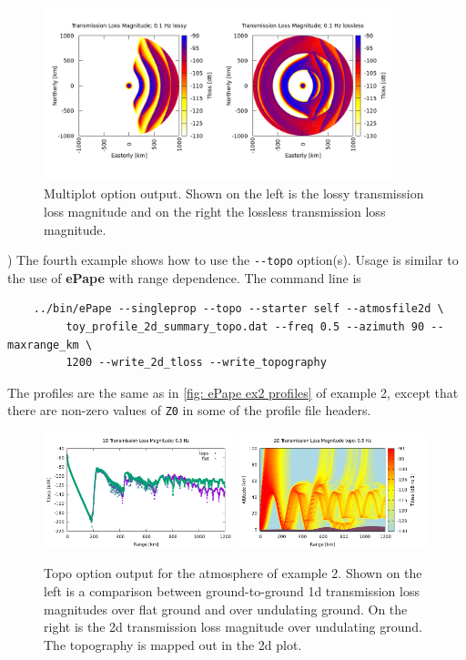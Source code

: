 \begin{figure}[h]
\begin{center}
\includegraphics[width=0.9\textwidth]{figs/ePape_ex3}
\end{center}
\caption{Multiplot option output. Shown on the left is the lossy transmission loss magnitude and on the right the lossless transmission loss magnitude.}
\label{fig: ePape ex3}
\end{figure}

) The fourth example shows how to use the \verb+--topo+ option(s). Usage is similar to the use of {\bf ePape} with range dependence. The command line is 
\begin{verbatim}
    ../bin/ePape --singleprop --topo --starter self --atmosfile2d \
         toy_profile_2d_summary_topo.dat --freq 0.5 --azimuth 90 --maxrange_km \
         1200 --write_2d_tloss --write_topography
\end{verbatim}
The profiles are the same as in \ref{fig: ePape ex2 profiles} of example 2, except that there are non-zero values of \verb+Z0+ in some of the profile file headers. 
\begin{figure}[h]
\begin{center}
\includegraphics[width=0.49\textwidth]{figs/ePape_ex4_1d}
\includegraphics[width=0.49\textwidth]{figs/ePape_ex4_2d}
\end{center}
\caption{Topo option output for the atmosphere of example 2. Shown on the left is a comparison between ground-to-ground 1d transmission loss magnitudes over flat ground and over undulating ground. On the right is the 2d transmission loss magnitude over undulating ground. The topography is mapped out in the 2d plot.}
\label{fig: ePape ex4}
\end{figure}

